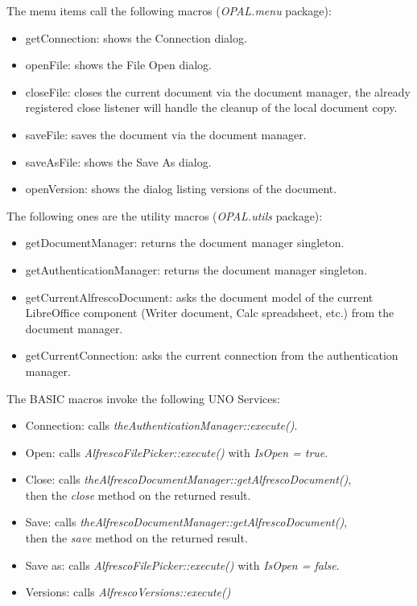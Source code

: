The menu items call the following macros (\emph{OPAL.menu} package):

\begin{itemize}
\item getConnection: shows the Connection dialog.
\item openFile: shows the File Open dialog.
\item closeFile: closes the current document via the document manager, the
already registered close listener will handle the cleanup of the local document
copy.
\item saveFile: saves the document via the document manager.
\item saveAsFile: shows the Save As dialog.
\item openVersion: shows the dialog listing versions of the document.
\end{itemize}

The following ones are the utility macros (\emph{OPAL.utils} package):

\begin{itemize}
\item getDocumentManager: returns the document manager singleton.
\item getAuthenticationManager: returns the document manager singleton.
\item getCurrentAlfrescoDocument: asks the document model of the current LibreOffice component (Writer document, Calc spreadsheet, etc.) from the document manager.
\item getCurrentConnection: asks the current connection from the authentication manager.
\end{itemize}

The BASIC macros invoke the following UNO Services:

\begin{itemize}
\item Connection: calls \emph{theAuthenticationManager::execute()}.
\item Open: calls \emph{AlfrescoFilePicker::execute()} with \emph{IsOpen = true}.
\item Close: calls \emph{theAlfrescoDocumentManager::getAlfrescoDocument()}, \\ then the \emph{close} method on the returned result.
\item Save: calls \emph{theAlfrescoDocumentManager::getAlfrescoDocument()}, \\ then the \emph{save} method on the returned result.
\item Save as: calls \emph{AlfrescoFilePicker::execute()} with \emph{IsOpen = false}.
\item Versions: calls \emph{AlfrescoVersions::execute()}
\end{itemize}

